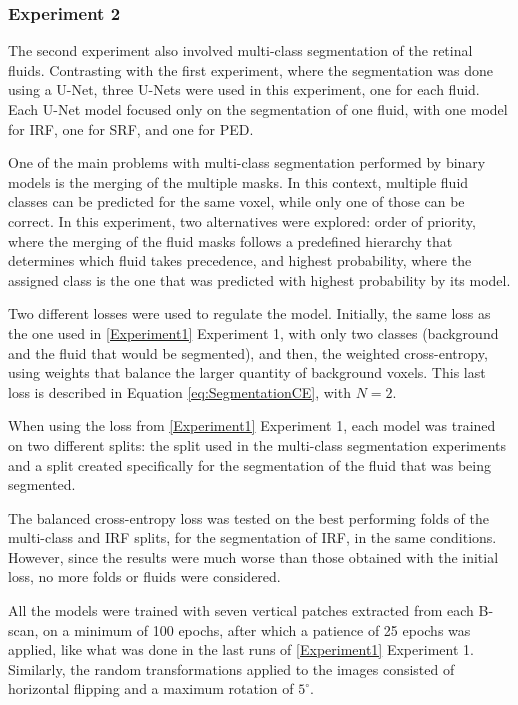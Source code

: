 \subsubsection{Experiment 2}\label{Experiment2}
The second experiment also involved multi-class segmentation of the retinal fluids. Contrasting with the first experiment, where the segmentation was done using a U-Net, three U-Nets were used in this experiment, one for each fluid. Each U-Net model focused only on the segmentation of one fluid, with one model for IRF, one for SRF, and one for PED.
\par
One of the main problems with multi-class segmentation performed by binary models is the merging of the multiple masks. In this context, multiple fluid classes can be predicted for the same voxel, while only one of those can be correct. In this experiment, two alternatives were explored: order of priority, where the merging of the fluid masks follows a predefined hierarchy that determines which fluid takes precedence, and highest probability, where the assigned class is the one that was predicted with highest probability by its model.
\par
Two different losses were used to regulate the model. Initially, the same loss as the one used in \ref{Experiment1} Experiment 1, with only two classes (background and the fluid that would be segmented), and then, the weighted cross-entropy, using weights that balance the larger quantity of background voxels. This last loss is described in Equation \ref{eq:SegmentationCE}, with $N=2$.
\par
When using the loss from \ref{Experiment1} Experiment 1, each model was trained on two different splits: the split used in the multi-class segmentation experiments and a split created specifically for the segmentation of the fluid that was being segmented. 
\par
The balanced cross-entropy loss was tested on the best performing folds of the multi-class and IRF splits, for the segmentation of IRF, in the same conditions. However, since the results were much worse than those obtained with the initial loss, no more folds or fluids were considered.
\par
All the models were trained with seven vertical patches extracted from each B-scan, on a minimum of 100 epochs, after which a patience of 25 epochs was applied, like what was done in the last runs of \ref{Experiment1} Experiment 1. Similarly, the random transformations applied to the images consisted of horizontal flipping and a maximum rotation of $5^{\circ}$.

